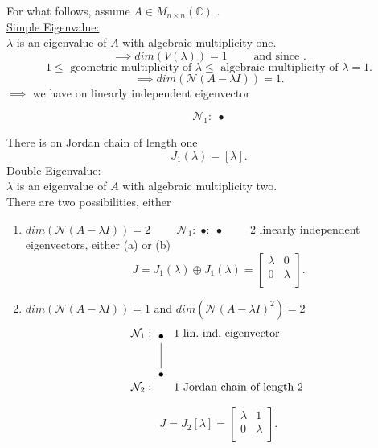 \documentclass{report}
\begin{document}
   
   For what follows, assume $ A \in M _{ n \times  n} \left(  \mathbb{C} \right) $ .\\
   \underline{Simple Eigenvalue:} \\
   $ \lambda$ is an eigenvalue of $ A$ with algebraic multiplicity one.
   \[
   \implies dim \left(  V \left( \lambda \right)  \right) = 1 \qquad  \text{ and since }
   .\] 
   \[
   1 \leq \text{ geometric multiplicity of } \lambda \leq \text{ algebraic multiplicity of } \lambda = 1
   .\] 
   \[
   \implies dim \left( \mathcal{N} \left(  A - \lambda I \right)  \right) =1
   .\] 
   $ \implies$ we have on linearly independent eigenvector 

         \[
\mathcal{N}_1 :\; \bullet
\]




   There is on Jordan chain of length one
   \[
	   J_1 \left( \lambda \right) = \left[ \lambda \right] 
   .\] 
   \underline{Double Eigenvalue:} \\
   $ \lambda$ is an eigenvalue of $ A$ with algebraic multiplicity two.\\
   There are two possibilities, either 
   \begin{enumerate} [label=(\alph*)]
   \item $ dim \left( \mathcal{N} \left( A - \lambda I \right)  \right) =2 \qquad $   $
\mathcal{N}_1 :\; \bullet   :\; \bullet  \qquad  $ 2 linearly independent eigenvectors, either (a) or (b) 
\[
J = J_1 \left( \lambda \right) \oplus J_1 \left( \lambda \right) = \begin{bmatrix}
\lambda & 0\\
0 & \lambda\\
\end{bmatrix}
.\] 

   \item $ dim \left( \mathcal{N} \left( A - \lambda I \right)  \right) =1 $   and $ dim \left( \mathcal{N} \left(  A - \lambda I \right) ^2 \right) =2$ 
	         \[
\begin{array}{@{\;}l@{\;}c@{\;}l}
\mathcal{N}_1: &
\begin{tikzpicture}[baseline=(top)]
  \node (top) at (0,0)    {$\bullet$};
  \node (bot) at (0,-1.2) {$\bullet$};
  \draw (top) -- (bot);
\end{tikzpicture}
&\; 1 \text{ lin.\ ind.\ eigenvector}\\[1.8em]   %
 \mathcal{N}_2: & &\; 1 \text{ Jordan chain of length } 2
\end{array}
\]

    \[
	    J = J_2 \left[ \lambda \right]  = \begin{bmatrix}
	    \lambda & 1\\
	    0 & \lambda\\
	    \end{bmatrix}
    .\] 
   \end{enumerate}
\end{document}
